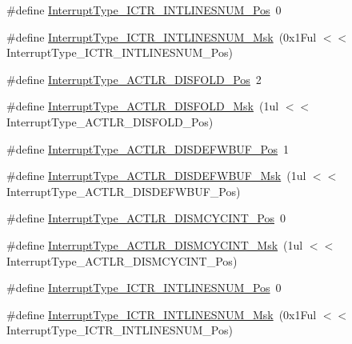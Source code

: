 \begin{DoxyCompactItemize}
\item 
\#define \hyperlink{group___c_m_s_i_s___c_m3___interrupt_type_ga5d164b3cb981bd85afd35892d180a5c3}{Interrupt\+Type\+\_\+\+I\+C\+T\+R\+\_\+\+I\+N\+T\+L\+I\+N\+E\+S\+N\+U\+M\+\_\+\+Pos}~0
\item 
\#define \hyperlink{group___c_m_s_i_s___c_m3___interrupt_type_ga0a2c325cefdab97bd8ce3336a66a803e}{Interrupt\+Type\+\_\+\+I\+C\+T\+R\+\_\+\+I\+N\+T\+L\+I\+N\+E\+S\+N\+U\+M\+\_\+\+Msk}~(0x1\+Ful $<$$<$ Interrupt\+Type\+\_\+\+I\+C\+T\+R\+\_\+\+I\+N\+T\+L\+I\+N\+E\+S\+N\+U\+M\+\_\+\+Pos)
\item 
\#define \hyperlink{group___c_m_s_i_s___c_m3___interrupt_type_gaaa37f212111e6dbc9505d46b8bf8fa3e}{Interrupt\+Type\+\_\+\+A\+C\+T\+L\+R\+\_\+\+D\+I\+S\+F\+O\+L\+D\+\_\+\+Pos}~2
\item 
\#define \hyperlink{group___c_m_s_i_s___c_m3___interrupt_type_gac4d872ecfcf7dcb93f98824ada52a527}{Interrupt\+Type\+\_\+\+A\+C\+T\+L\+R\+\_\+\+D\+I\+S\+F\+O\+L\+D\+\_\+\+Msk}~(1ul $<$$<$ Interrupt\+Type\+\_\+\+A\+C\+T\+L\+R\+\_\+\+D\+I\+S\+F\+O\+L\+D\+\_\+\+Pos)
\item 
\#define \hyperlink{group___c_m_s_i_s___c_m3___interrupt_type_ga46fed31841c33811db8b3a9cbae6347b}{Interrupt\+Type\+\_\+\+A\+C\+T\+L\+R\+\_\+\+D\+I\+S\+D\+E\+F\+W\+B\+U\+F\+\_\+\+Pos}~1
\item 
\#define \hyperlink{group___c_m_s_i_s___c_m3___interrupt_type_ga3cecf9e9d75112aed3ed055343cbe23f}{Interrupt\+Type\+\_\+\+A\+C\+T\+L\+R\+\_\+\+D\+I\+S\+D\+E\+F\+W\+B\+U\+F\+\_\+\+Msk}~(1ul $<$$<$ Interrupt\+Type\+\_\+\+A\+C\+T\+L\+R\+\_\+\+D\+I\+S\+D\+E\+F\+W\+B\+U\+F\+\_\+\+Pos)
\item 
\#define \hyperlink{group___c_m_s_i_s___c_m3___interrupt_type_ga101a93632e4480073299b775bc5cbf12}{Interrupt\+Type\+\_\+\+A\+C\+T\+L\+R\+\_\+\+D\+I\+S\+M\+C\+Y\+C\+I\+N\+T\+\_\+\+Pos}~0
\item 
\#define \hyperlink{group___c_m_s_i_s___c_m3___interrupt_type_ga0c020eb28544979bfac2e219ed53c999}{Interrupt\+Type\+\_\+\+A\+C\+T\+L\+R\+\_\+\+D\+I\+S\+M\+C\+Y\+C\+I\+N\+T\+\_\+\+Msk}~(1ul $<$$<$ Interrupt\+Type\+\_\+\+A\+C\+T\+L\+R\+\_\+\+D\+I\+S\+M\+C\+Y\+C\+I\+N\+T\+\_\+\+Pos)
\item 
\#define \hyperlink{group___c_m_s_i_s___c_m3___interrupt_type_ga5d164b3cb981bd85afd35892d180a5c3}{Interrupt\+Type\+\_\+\+I\+C\+T\+R\+\_\+\+I\+N\+T\+L\+I\+N\+E\+S\+N\+U\+M\+\_\+\+Pos}~0
\item 
\#define \hyperlink{group___c_m_s_i_s___c_m3___interrupt_type_ga0a2c325cefdab97bd8ce3336a66a803e}{Interrupt\+Type\+\_\+\+I\+C\+T\+R\+\_\+\+I\+N\+T\+L\+I\+N\+E\+S\+N\+U\+M\+\_\+\+Msk}~(0x1\+Ful $<$$<$ Interrupt\+Type\+\_\+\+I\+C\+T\+R\+\_\+\+I\+N\+T\+L\+I\+N\+E\+S\+N\+U\+M\+\_\+\+Pos)
$$
\end{DoxyCompactItemize}
